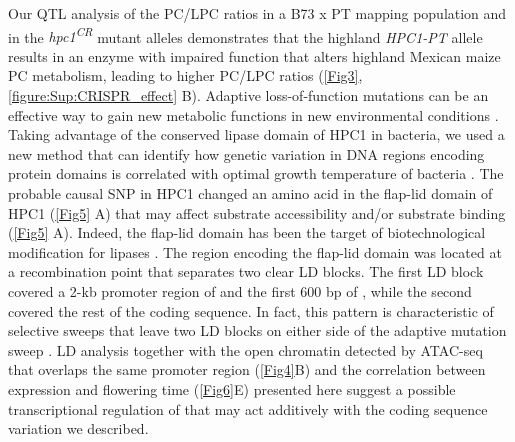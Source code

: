Our QTL analysis of the PC/LPC ratios in a B73 x PT mapping population and in the \textit{hpc1\textsuperscript{CR}} mutant alleles demonstrates that the highland \textit{HPC1-PT} allele results in an enzyme with impaired function that alters highland Mexican maize PC metabolism, leading to higher PC/LPC ratios (\autoref{Fig3}, \autoref{figure:Sup:CRISPR_effect} B). 
Adaptive loss-of-function mutations can be an effective way to gain new metabolic functions in new environmental conditions \citep{hottes2013-np}.
Taking advantage of the conserved lipase domain of HPC1 in bacteria, we used a new method that can identify how genetic variation in DNA regions encoding protein domains is correlated with optimal growth temperature of bacteria \citep{jensen2021-iv, jensen2021-zm}.
The probable causal SNP in HPC1 changed an amino acid in the flap-lid domain of HPC1 (\autoref{Fig5} A) that may affect substrate  accessibility and/or substrate binding (\autoref{Fig5} A). 
Indeed, the flap-lid domain has been the target of biotechnological modification for lipases \citep{khan2017-ua}.
The region encoding the flap-lid domain was located at a recombination point that separates two clear LD blocks. 
The first LD block covered a 2-kb promoter region of \hpc and the first 600 bp of \hpc, while the second covered the rest of the \hpc coding sequence. 
In fact, this pattern is characteristic of selective sweeps that leave two LD blocks on either side of the adaptive mutation sweep \citep{kim2004-pa}. 
LD analysis together with the open chromatin detected by ATAC-seq that overlaps the same promoter region (\autoref{Fig4}B) and the correlation between \hpc expression and flowering time (\autoref{Fig6}E) presented here suggest a possible transcriptional regulation of \hpc that may act additively with the coding sequence variation we described. 

